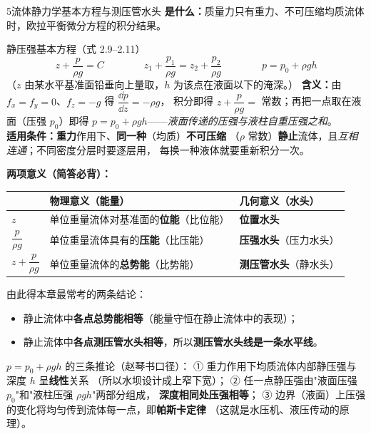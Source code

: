 \begin{kaodian}{5}{流体静力学基本方程与测压管水头}
\textbf{是什么：}质量力只有重力、不可压缩均质流体时，欧拉平衡微分方程的积分结果。

\begin{gongshi}{静压强基本方程（式 2.9--2.11）}
\[ z+\frac{p}{\rho g}=C \qquad\qquad
   z_1+\frac{p_1}{\rho g}=z_2+\frac{p_2}{\rho g} \qquad\qquad
   p=p_0+\rho g h \]
（$z$ 由某水平基准面铅垂向上量取，$h$ 为该点在液面以下的淹深。）
\textbf{含义：}由 $f_x=f_y=0$、$f_z=-g$ 得 $\dfrac{\dd p}{\dd z}=-\rho g$，
积分即得 $z+\dfrac{p}{\rho g}=$ 常数；再把一点取在液面（压强 $p_0$）即得
$p=p_0+\rho g h$——\emph{液面传递的压强与液柱自重压强之和}。\\
\textbf{适用条件：}\textbf{重力}作用下、\textbf{同一种}（均质）\textbf{不可压缩}
（$\rho$ 常数）\textbf{静止}流体，且\emph{互相连通}；不同密度分层时要逐层用，
每换一种液体就要重新积分一次。
\end{gongshi}

\textbf{两项意义（简答必背）：}
\begin{center}
\begin{tabularx}{\textwidth}{@{}lXX@{}}
\toprule
 & 物理意义（能量） & 几何意义（水头） \\
\midrule
$z$ & 单位重量流体对基准面的\textbf{位能}（比位能） & \textbf{位置水头} \\[1mm]
$\dfrac{p}{\rho g}$ & 单位重量流体具有的\textbf{压能}（比压能） & \textbf{压强水头}（压力水头） \\[1mm]
$z+\dfrac{p}{\rho g}$ & 单位重量流体的\textbf{总势能}（比势能） & \textbf{测压管水头}（静水头） \\
\bottomrule
\end{tabularx}
\end{center}

由此得本章最常考的两条结论：
\begin{itemize}
\item 静止流体中\textbf{各点总势能相等}（能量守恒在静止流体中的表现）；
\item 静止流体中\textbf{各点测压管水头相等}，所以\textbf{测压管水头线是一条水平线}。
\end{itemize}

$p=p_0+\rho g h$ 的三条推论（赵琴书口径）：
① 重力作用下均质流体内部静压强与深度 $h$ 呈\textbf{线性}关系
（所以水坝设计成上窄下宽）；
② 任一点静压强由"液面压强 $p_0$"和"液柱压强 $\rho g h$"两部分组成，
\textbf{深度相同处压强相等}；
③ 边界（液面）上压强的变化将均匀传到流体每一点，即\textbf{帕斯卡定律}
（这就是水压机、液压传动的原理）。


\end{kaodian}
